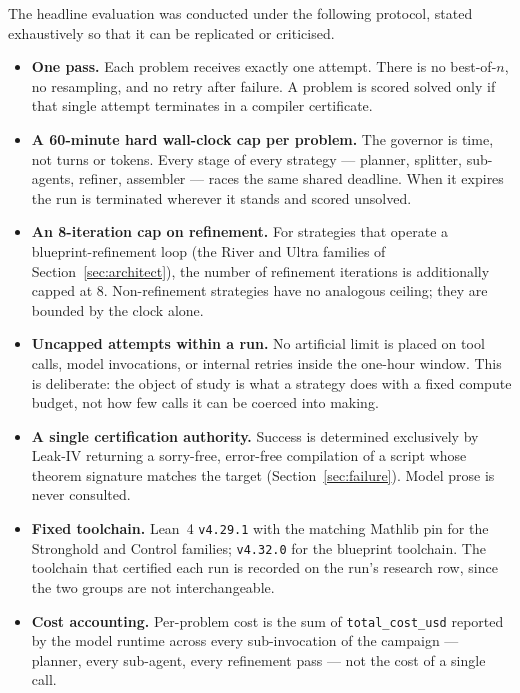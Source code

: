 \documentclass[12pt, a4paper]{article}
\begin{document}
The headline evaluation was conducted under the following protocol, stated
exhaustively so that it can be replicated or criticised.

\begin{itemize}[leftmargin=*]
  \item \textbf{One pass.} Each problem receives exactly one attempt. There
    is no best-of-$n$, no resampling, and no retry after failure. A problem
    is scored solved only if that single attempt terminates in a
    compiler certificate.
  \item \textbf{A 60-minute hard wall-clock cap per problem.} The governor
    is time, not turns or tokens. Every stage of every strategy --- planner,
    splitter, sub-agents, refiner, assembler --- races the same shared
    deadline. When it expires the run is terminated wherever it stands and
    scored unsolved.
  \item \textbf{An 8-iteration cap on refinement.} For strategies that
    operate a blueprint-refinement loop (the River and Ultra families of
    Section~\ref{sec:architect}), the number of refinement iterations is
    additionally capped at 8. Non-refinement strategies have no analogous
    ceiling; they are bounded by the clock alone.
  \item \textbf{Uncapped attempts within a run.} No artificial limit is
    placed on tool calls, model invocations, or internal retries inside the
    one-hour window. This is deliberate: the object of study is what a
    strategy does with a fixed compute budget, not how few calls it can be
    coerced into making.
  \item \textbf{A single certification authority.} Success is determined
    exclusively by Leak-IV returning a sorry-free, error-free compilation of
    a script whose theorem signature matches the target
    (Section~\ref{sec:failure}). Model prose is never consulted.
  \item \textbf{Fixed toolchain.} Lean~4 \texttt{v4.29.1} with the matching
    Mathlib pin for the Stronghold and Control families; \texttt{v4.32.0}
    for the blueprint toolchain. The toolchain that certified each run is
    recorded on the run's research row, since the two groups are not
    interchangeable.
  \item \textbf{Cost accounting.} Per-problem cost is the sum of
    \texttt{total\_cost\_usd} reported by the model runtime across every
    sub-invocation of the campaign --- planner, every sub-agent, every
    refinement pass --- not the cost of a single call.
\end{itemize}
\end{document}
